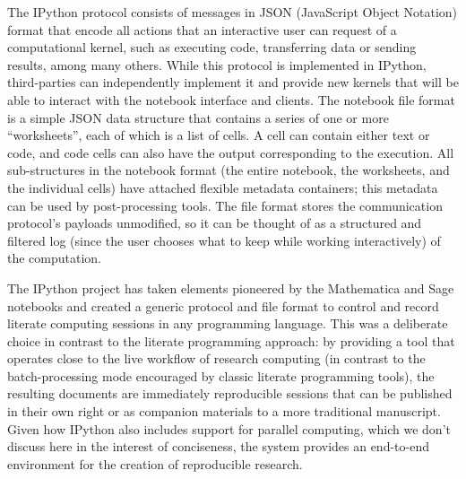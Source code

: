 \documentclass[ChapterTOCs,krantz2]{krantz} %
\begin{document}
The IPython protocol consists of messages in JSON (JavaScript Object Notation)
format that encode all actions that an interactive user can request of a
computational kernel, such as executing code, transferring data or sending
results, among many others.  While this protocol is implemented in IPython,
third-parties can independently implement it and provide new kernels that will
be able to interact with the notebook interface and clients.  The notebook file
format is a simple JSON data structure that contains a series of one or more
``worksheets'', each of which is a list of cells.  A cell can contain either
text or code, and code cells can also have the output corresponding to the
execution.  All sub-structures in the notebook format (the entire notebook, the
worksheets, and the individual cells) have attached flexible metadata
containers; this metadata can be used by post-processing tools.  The file
format stores the communication protocol's payloads unmodified, so it can be
thought of as a structured and filtered log (since the user chooses what to
keep while working interactively) of the computation.  

The IPython project has taken elements pioneered by the Mathematica and Sage
notebooks and created a generic protocol and file format to control and record
literate computing sessions in any programming language.  This was a deliberate
choice in contrast to the literate programming approach: by providing a tool
that operates close to the live workflow of research computing (in contrast to
the batch-processing mode encouraged by classic literate programming tools),
the resulting documents are immediately reproducible sessions that can be
published in their own right or as companion materials to a more traditional
manuscript.  Given how IPython also includes support for parallel computing,
which we don't discuss here in the interest of conciseness, the system provides
an end-to-end environment for the creation of reproducible research.
\end{document}
